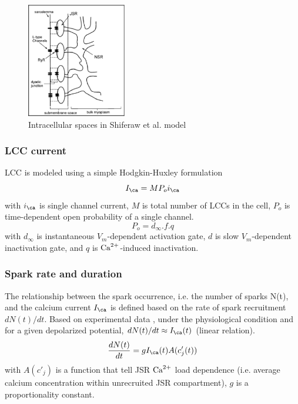 \begin{figure}[hbt]
  \centerline{\includegraphics[height=5cm,
    angle=0]{./images/shiferaw_2003.eps}}
  \caption{Intracellular spaces in Shiferaw et al. model}
  \label{fig:smith_spark}
\end{figure}

\subsubsection{LCC current}

LCC is modeled using a simple Hodgkin-Huxley formulation
\begin{equation}
I_\ca = MP_o i_\ca
\end{equation}
with $i_\ca$ is single channel current, $M$ is total number of LCCs in the cell,
$P_o$ is time-dependent open probability of a single channel.
\begin{equation}
P_o = d_\infty .f.q
\end{equation}
with $d_\infty$ is instantaneous $V_m$-dependent activation gate, $d$ is slow
$V_m$-dependent inactivation gate, and $q$ is ${\text{Ca}^{2+}}$-induced inactivation.

\subsubsection{Spark rate and duration}

The relationship between the spark occurrence, i.e. the number of sparks N(t),
and the calcium current $I_\ca$ is defined based on the rate of spark
recruitment $dN(t)/dt$. Based on experimental data \citep{collier1999}, under
the physiological condition and for a given depolarized potential, $dN(t)/dt
\approx I_\ca(t)$ (linear relation).
\begin{equation}
\label{eq:shiferaw2003_03}
\frac{dN(t)}{dt} = gI_\ca(t) A(c'_j(t))
\end{equation}
with $A(c'_j)$ is a function that tell JSR ${\text{Ca}^{2+}}$ load dependence (i.e. average
calcium concentration within unrecruited JSR compartment), $g$ is a
proportionality constant.

